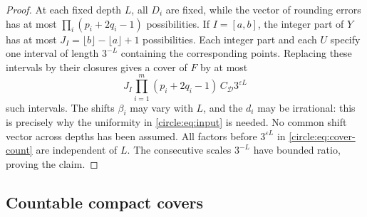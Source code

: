 \begin{proof}
At each fixed depth $L$, all $D_i$ are fixed, while the vector of
rounding errors has at most $\prod_i(p_i+2q_i-1)$ possibilities.
If $I=[a,b]$, the integer part of $Y$ has at most
$J_I=\lfloor b\rfloor-\lfloor a\rfloor+1$ possibilities.
Each integer part and each $U$ specify one interval of length $3^{-L}$
containing the corresponding points. Replacing these intervals by
their closures gives a cover of $F$ by at most
\begin{equation}\label{circle:eq:cover-count}
        J_I\prod_{i=1}^m(p_i+2q_i-1)\,C_{\mathcal D}3^{\varepsilon L}
\end{equation}
such intervals. The shifts $\beta_i$ may vary with $L$, and the $d_i$
may be irrational: this is precisely why the uniformity in
\eqref{circle:eq:input} is needed. No common shift vector across depths
has been assumed. All factors before $3^{\varepsilon L}$ in
\eqref{circle:eq:cover-count} are independent of $L$.
The consecutive scales $3^{-L}$ have bounded ratio, proving the claim.
\end{proof}

\subsection{Countable compact covers}

